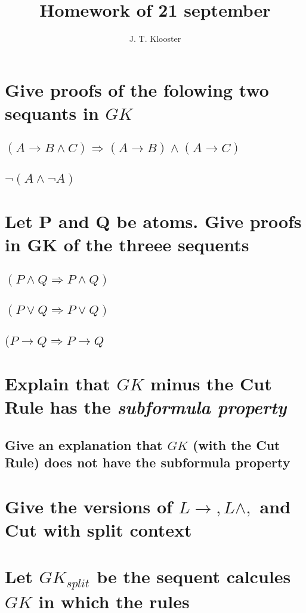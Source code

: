 \documentclass{article}
\begin{document}
\author{J. T. Klooster}
\title{Homework of 21 september}
\maketitle

\section{Give proofs of the folowing two sequants in $GK$}
\subsection{$(A\to B\wedge C)\Rightarrow(A\to B)\wedge(A\to C)$}
\subsection{$\neg(A\wedge\neg A)$}
\section{Let P and Q be atoms. Give proofs in GK of the threee sequents}
\subsection{$(P\wedge Q \Rightarrow P \wedge Q)$}
\subsection{$(P\vee Q \Rightarrow P \vee Q)$}
\subsection{$(P \to Q \Rightarrow P \to Q$}
\section{Explain that $GK$ minus the Cut Rule has the \emph{subformula property}}
\subsection{Give an explanation that $GK$ (with the Cut Rule) does not have
the subformula property}
\section{Give the versions of $L \to, L\wedge,$ and Cut with split context}
\section{Let $GK_{split}$ be the sequent calcules $GK$ in which the rules}
\end{document}

